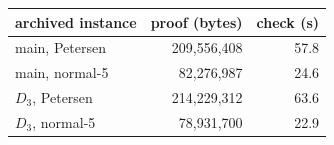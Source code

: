\begin{tabular}{lrr}
\toprule
archived instance & proof (bytes) & check (s)\\
\midrule
main, Petersen & 209{,}556{,}408 & 57.8\\
main, normal-5 & 82{,}276{,}987 & 24.6\\
$D_3$, Petersen & 214{,}229{,}312 & 63.6\\
$D_3$, normal-5 & 78{,}931{,}700 & 22.9\\
\bottomrule
\end{tabular}
